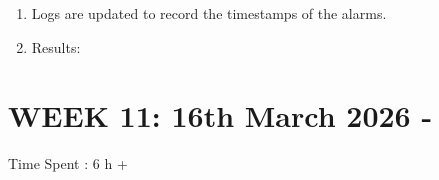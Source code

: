 \documentclass{article}
\begin{document}
\begin{enumerate}
\begin{enumerate}
\begin{enumerate}
\begin{lstlisting}[caption={Acquiring Partial Wake Lock},label={label: Acquiring Partial Wake Lock}]
PowerManager powerManager = (PowerManager) appContext.getSystemService(Context.POWER_SERVICE);
final PowerManager.WakeLock wakeLock = powerManager.newWakeLock(
    PowerManager.PARTIAL_WAKE_LOCK,
    "JODO::AlarmWakeLock"
);
//Acquire with timeout
wakeLock.acquire(2*60*1000L);
\end{lstlisting} 
        \end{enumerate}
    \end{enumerate}
    \item Logs are updated to record the timestamps of the alarms.
    \item Results: 
\end{enumerate}


\newpage
\section{WEEK 11: 16th March 2026 - }
Time Spent : 6 h + 
\end{document}
